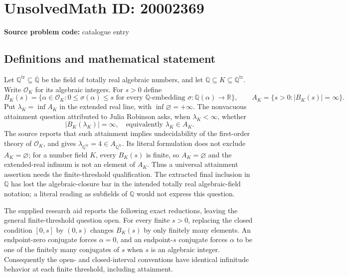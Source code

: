 \documentclass[11pt]{article}
\newcommand{\Q}{\mathbb{Q}}
\newcommand{\R}{\mathbb{R}}
\begin{document}
\section*{UnsolvedMath ID: 20002369}
\textbf{Source problem code:} catalogue entry
\subsection{Definitions and mathematical statement}
Let $\Q^{\mathrm{tr}}\subseteq\overline{\Q}$ be the field of totally real algebraic numbers, and let $\Q\subseteq K\subseteq\Q^{\mathrm{tr}}$. Write $\mathcal O_K$ for its algebraic integers. For $s>0$ define
\[
 B_K(s)=\{\alpha\in\mathcal O_K:
   0\le\sigma(\alpha)\le s\text{ for every }\Q\text{-embedding }
      \sigma:\Q(\alpha)\to\R\},
 \qquad A_K=\{s>0:|B_K(s)|=\infty\}.
\]
Put $\lambda_K=\inf A_K$ in the extended real line, with $\inf\varnothing=+\infty$. The nonvacuous attainment question attributed to Julia Robinson asks, when $\lambda_K<\infty$, whether
\[
 |B_K(\lambda_K)|=\infty,
 \quad\text{equivalently }\lambda_K\in A_K.
\]
The source reports that such attainment implies undecidability of the first-order theory of $\mathcal O_K$, and gives $\lambda_{\Q^{\mathrm{tr}}}=4\in A_{\Q^{\mathrm{tr}}}$. Its literal formulation does not exclude $A_K=\varnothing$; for a number field $K$, every $B_K(s)$ is finite, so $A_K=\varnothing$ and the extended-real infimum is not an element of $A_K$. Thus a universal attainment assertion needs the finite-threshold qualification. The extracted final inclusion in $\Q$ has lost the algebraic-closure bar in the intended totally real algebraic-field notation; a literal reading as subfields of $\Q$ would not express this question.

The supplied research aid reports the following exact reductions, leaving the general finite-threshold question open. For every finite $s>0$, replacing the closed condition $[0,s]$ by $(0,s)$ changes $B_K(s)$ by only finitely many elements. An endpoint-zero conjugate forces $\alpha=0$, and an endpoint-$s$ conjugate forces $\alpha$ to be one of the finitely many conjugates of $s$ when $s$ is an algebraic integer. Consequently the open- and closed-interval conventions have identical infinitude behavior at each finite threshold, including attainment.
\end{document}
